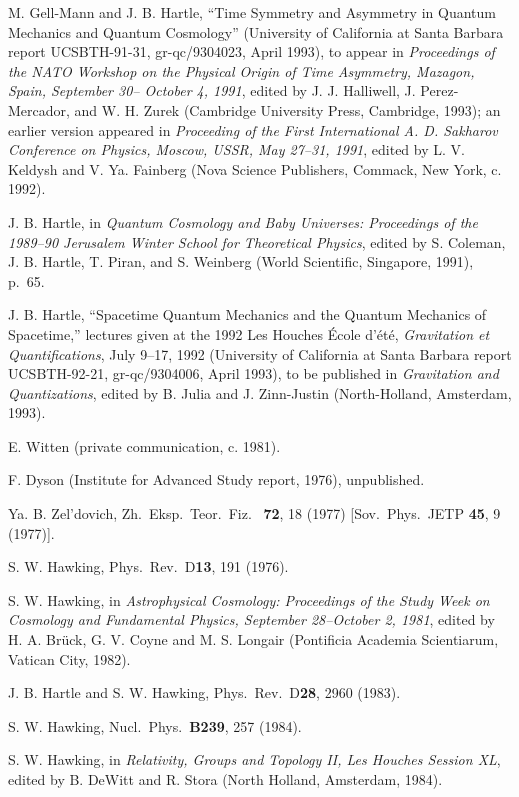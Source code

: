 \begin{thebibliography}{999}
 M. Gell-Mann and J. B. Hartle, ``Time Symmetry
and Asymmetry in Quantum Mechanics and Quantum
Cosmology'' (University of California at Santa Barbara
report UCSBTH-91-31, gr-qc/9304023, April 1993),
to appear in {\em
Proceedings of the NATO Workshop on the Physical Origin
of Time Asymmetry, Mazagon, Spain, September 30--
October 4, 1991}, edited by J. J. Halliwell, J. Perez-
Mercador, and W. H. Zurek (Cambridge University Press,
Cambridge, 1993); an earlier version appeared in
{\em Proceeding of the First
International A. D. Sakharov Conference on Physics,
Moscow, USSR, May 27--31, 1991}, edited by L. V. Keldysh
and V. Ya. Fainberg (Nova Science Publishers, Commack,
New York, c. 1992).

 J. B. Hartle, in {\em Quantum Cosmology and
Baby Universes:  Proceedings of the 1989--90 Jerusalem
Winter School for Theoretical Physics}, edited by S.
Coleman, J. B. Hartle, T. Piran, and S. Weinberg (World
Scientific, Singapore, 1991), p.~65.

 J. B. Hartle, ``Spacetime Quantum Mechanics
and the Quantum Mechanics of Spacetime,'' lectures given
at the 1992 Les Houches \'{E}cole d'\'{e}t\'{e}, {\em
Gravitation et Quantifications}, July 9--17, 1992
(University of California at Santa Barbara
report UCSBTH-92-21, gr-qc/9304006, April 1993),
to be published in {\em Gravitation and Quantizations},
edited by B. Julia and J. Zinn-Justin (North-Holland,
Amsterdam, 1993).

 E. Witten (private communication, c. 1981).

 F. Dyson (Institute for Advanced Study report, 1976),
unpublished.

 Ya. B. Zel'dovich, Zh.\ Eksp.\ Teor.\ Fiz.\ {\bf
72}, 18
(1977) [Sov.\ Phys.\ JETP {\bf 45}, 9 (1977)].

 S. W. Hawking,  Phys.\ Rev.\ D{\bf 13}, 191 (1976).

 S. W. Hawking, in {\em Astrophysical Cosmology:
Proceedings of the Study Week on Cosmology and
Fundamental Physics, September 28--October 2, 1981},
edited by H. A. Br\"uck, G. V. Coyne and M. S. Longair
(Pontificia Academia Scientiarum, Vatican City, 1982).

 J. B. Hartle and S. W. Hawking,
Phys.\ Rev.\ D{\bf 28}, 2960 (1983).

 S. W. Hawking, Nucl.\ Phys.\ {\bf B239},
257 (1984).

 S. W. Hawking, in {\em Relativity, Groups and
Topology II, Les Houches Session XL}, edited by B. DeWitt and
R. Stora (North Holland, Amsterdam, 1984).


\end{thebibliography}
